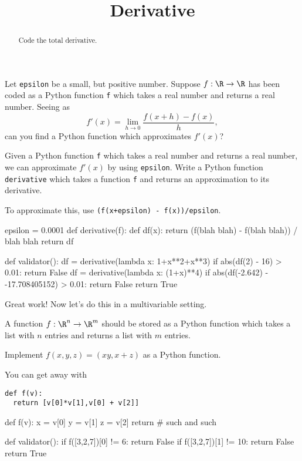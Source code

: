 \documentclass{ximera}
\title{Derivative}
\begin{document}
\begin{abstract}
  Code the total derivative.
\end{abstract}

\begin{exercise}
  Let \texttt{epsilon} be a small, but positive number.  Suppose $f:\R
  \to \R$ has been coded as a Python function \texttt{f} which takes a
  real number and returns a real number.  Seeing as
  $$
  f'(x) = \lim_{h \to 0} \frac{f(x+h) - f(x)}{h},
  $$
  can you find a Python function which approximates $f'(x)$?

  Given a Python function \texttt{f} which takes a real number and
  returns a real number, we can approximate $f'(x)$ by using
  \texttt{epsilon}.  Write a Python function \texttt{derivative} which
  takes a function \texttt{f} and returns an approximation to its
  derivative.

\begin{solution}
  \begin{hint}
    To approximate this, use \texttt{(f(x+epsilon) - f(x))/epsilon}.
  \end{hint}
\begin{python}
epsilon = 0.0001
def derivative(f):
  def df(x): return (f(blah blah) - f(blah blah)) / blah blah
  return df


def validator():
  df = derivative(lambda x: 1+x**2+x**3)
  if abs(df(2) - 16) > 0.01:
    return False
  df = derivative(lambda x: (1+x)**4)
  if abs(df(-2.642) - -17.708405152) > 0.01:
    return False
  return True
\end{python}
\end{solution}

  Great work!  Now let's do this in a multivariable setting.

  A function $f:\R^n \to \R^m$ should be stored as a Python function
  which takes a list with $n$ entries and returns a list with $m$
  entries.  
  \begin{solution}
    Implement $f(x,y,z) = (xy,x+z)$ as a Python function.
    \begin{hint}
You can get away with
\begin{verbatim}
def f(v):
  return [v[0]*v[1],v[0] + v[2]]
\end{verbatim}
    \end{hint}
    \begin{python}
def f(v):
  x = v[0]
  y = v[1]
  z = v[2]
  return # such and such

def validator():
  if f([3,2,7])[0] != 6:
    return False
  if f([3,2,7])[1] != 10:
    return False
  return True
    \end{python}
  \end{solution}


\end{exercise}
\end{document}

